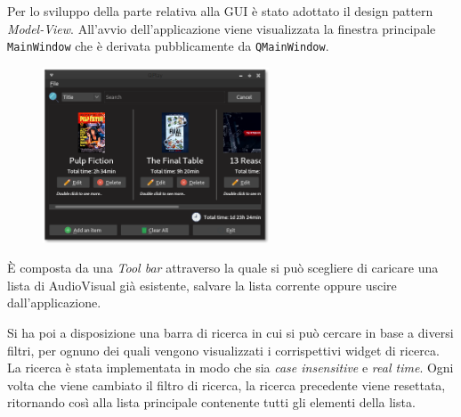 Per lo sviluppo della parte relativa alla GUI è stato adottato il design pattern \textit{Model-View}. \newline
All'avvio dell'applicazione viene visualizzata la finestra principale \texttt{MainWindow} che è derivata pubblicamente da \texttt{QMainWindow}. \newline
\begin{figure}
    \includegraphics[width=0.6\textwidth]{img/main} 
\end{figure}
È composta da una \textit{Tool bar} attraverso la quale si può scegliere di caricare una lista di AudioVisual già esistente, salvare la lista corrente oppure uscire dall'applicazione. \newline

Si ha poi a disposizione una barra di ricerca in cui si può cercare in base a diversi filtri, per ognuno dei quali vengono visualizzati i corrispettivi widget di ricerca. La ricerca è stata implementata in modo che sia \textit{case insensitive} e \textit{real time}. \newline
Ogni volta che viene cambiato il filtro di ricerca, la ricerca precedente viene resettata, ritornando così alla lista principale contenente tutti gli elementi della lista. \newline

